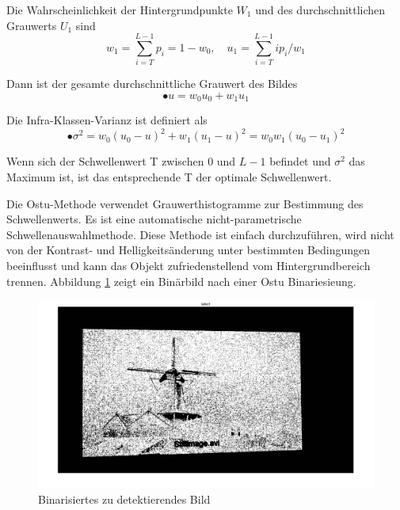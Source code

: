 Die Wahrscheinlichkeit der Hintergrundpunkte $ W_{1} $ und des durchschnittlichen Grauwerts $ U_{1} $ sind
\begin{equation}
  w_{1} = \sum_{i=T}^{L-1} p_{i} = 1-w_{0},\quad u_{1} = \sum_{i=T}^{L-1} ip_{i}/w_{1}
\end{equation}

Dann ist der gesamte durchschnittliche Grauwert des Bildes
\begin{equation}
• u = w_{0}u_{0} + w_{1}u_{1}
\end{equation}

Die Infra-Klassen-Varianz ist definiert als
\begin{equation}
•\sigma^2 = w_{0}(u_{0} - u)^2 + w_{1}(u_{1} - u)^2 = w_{0}w_{1}(u_{0} - u_{1})^2
\end{equation}

Wenn sich der Schwellenwert T zwischen 0 und $ L-1 $ befindet und $ \sigma^2 $ das Maximum ist, ist das entsprechende T der optimale Schwellenwert.%


Die Ostu-Methode verwendet Grauwerthistogramme zur Bestimmung des Schwellenwerts. Es ist eine automatische nicht-parametrische Schwellenauswahlmethode. Diese Methode ist einfach durchzuführen, wird nicht von der Kontrast- und Helligkeitsänderung unter bestimmten Bedingungen beeinflusst und kann das Objekt zufriedenstellend vom Hintergrundbereich trennen. Abbildung \ref{fig:binarisierungbild} zeigt ein Binärbild nach einer Ostu Binariesieung.

\begin{figure}[H]
 \centering 
  \includegraphics[keepaspectratio,width=1.0\textwidth]{images/4_ZweiteErfahrung/binar/binarisierung.pdf}
 \caption{Binarisiertes zu detektierendes Bild}
 \label{fig:binarisierungbild}
\end{figure} 




